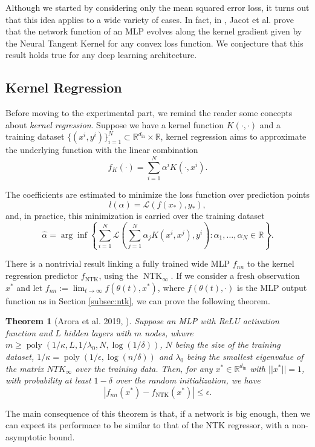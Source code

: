 \documentclass[11pt,notitlepage]{article}
\numberwithin{equation}{section}
\def\R{{\mathbb{R}}}
\DeclareMathOperator{\NTK}{NTK}
\DeclareMathOperator{\poly}{poly}
\newtheorem{theorem}{Theorem}[section]
\theoremstyle{remark}
\theoremstyle{definition}
\begin{document}
	Although we started by considering only the mean squared error loss, it turns out that this idea applies to a wide variety of cases.
	In fact, in \cite{jacot2018neural}, Jacot et al. prove that the network function of an MLP evolves along the kernel gradient given by the Neural Tangent Kernel for any convex loss function.
	We conjecture that this result holds true for any deep learning architecture.
	
	\subsection{Kernel Regression}\label{subsec:kernelRegression}
	
	Before moving to the experimental part, we remind the reader some concepts about \emph{kernel regression}.
	Suppose we have a kernel function $K(\cdot, \cdot)$ and a training dataset $\{(x^i, y^i)\}_{i=1}^N \subset \R^{d_\text{in}} \times \R$, kernel regression aims to approximate the underlying function with the linear combination
	\begin{equation}\label{eq:kernelReg}
		f_K(\cdot) = \sum_{i=1}^N \alpha^i K(\cdot, x^i).
	\end{equation}
	
	The coefficients are estimated to minimize the loss function over prediction points
	\begin{equation*}
		l(\alpha) = \mathcal{L}(f(x_*), y_*),
	\end{equation*}
	and, in practice, this minimization is carried over the training dataset
	\begin{equation}\label{eq:kernelCoeff}
		\widehat{\alpha} = \arg\inf\left\{\sum_{i=1}^N \mathcal{L}\left(\sum_{j=1}^N \alpha_j K(x^i,x^j), y^i\right) : \alpha_1,\dots, \alpha_N \in \R \right\}.
	\end{equation}
	
	There is a nontrivial result linking a fully trained wide MLP $f_{nn}$ to the kernel regression predictor $f_{\NTK}$, using the $\NTK_\infty$.
	If we consider a fresh observation $x^*$ and let $f_{nn} := \lim_{t \rightarrow \infty} f(\theta(t), x^*)$, where $f(\theta(t), \cdot)$ is the MLP output function as in Section \ref{subsec:ntk}, we can prove the following theorem.
	\begin{theorem}[Arora et al. 2019, \cite{arora2019exact}]
		Suppose an MLP with ReLU activation function and $L$ hidden layers with $m$ nodes, whwre $m \geq \poly(1/\kappa, L, 1/\lambda_0, N, \log(1/\delta))$, $N$ being the size of the training dataset, $1/\kappa = \poly(1/\epsilon, \log(n/\delta))$ and $\lambda_0$ being the smallest eigenvalue of the matrix $NTK_\infty$ over the training data.
		Then, for any $x^* \in \R^{d_\text{in}}$ with $||x^*|| = 1$, with probability at least $1-\delta$ over the random initialization, we have 
		\[|f_{nn}(x^*) - f_{\NTK}(x^*)| \leq \epsilon. \]
	\end{theorem}
    The main consequence of this theorem is that, if a network is big enough, then we can expect its performace to be similar to that of the NTK regressor, with a non-asymptotic bound.
	
\end{document}
